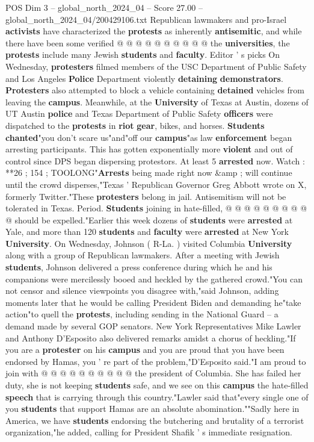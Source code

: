 \begin{textsample}{POS Dim 3 – global\_north\_2024\_04 – Score 27.00 – global\_north\_2024\_04/200429106.txt}
Republican lawmakers and pro-Israel \textbf{activists} have characterized the \textbf{protests} as inherently \textbf{antisemitic}, and while there have been some verified @ @ @ @ @ @ @ @ @ @ the \textbf{universities}, the \textbf{protests} include many Jewish \textbf{students} and \textbf{faculty}.
Editor ' s picks On Wednesday, \textbf{protesters} filmed members of the USC Department of Public Safety and Los Angeles \textbf{Police} Department violently \textbf{detaining} \textbf{demonstrators}. \textbf{Protesters} also attempted to block a vehicle containing \textbf{detained} vehicles from leaving the \textbf{campus}.
Meanwhile, at the \textbf{University} of Texas at Austin, dozens of UT Austin \textbf{police} and Texas Department of Public Safety \textbf{officers} were dispatched to the \textbf{protests} in \textbf{riot} \textbf{gear}, bikes, and horses. \textbf{Students} \textbf{chanted}"you don't scare us"and"off our \textbf{campus}"as law \textbf{enforcement} began arresting participants.
This has gotten exponentially more \textbf{violent} and out of control since DPS began dispersing protestors.
At least 5 \textbf{arrested} now.
Watch : **26 ; 154 ; TOOLONG"\textbf{Arrests} being made right now \&amp ; will continue until the crowd disperses,"Texas ' Republican Governor Greg Abbott wrote on X, formerly Twitter."These \textbf{protesters} belong in jail.
Antisemitism will not be tolerated in Texas.
Period. \textbf{Students} joining in hate-filled, @ @ @ @ @ @ @ @ @ @ should be expelled."Earlier this week dozens of \textbf{students} were \textbf{arrested} at Yale, and more than 120 \textbf{students} and \textbf{faculty} were \textbf{arrested} at New York \textbf{University}.
On Wednesday, Johnson ( R-La. ) visited Columbia \textbf{University} along with a group of Republican lawmakers.
After a meeting with Jewish \textbf{students}, Johnson delivered a press conference during which he and his companions were mercilessly booed and heckled by the gathered crowd."You can not censor and silence viewpoints you disagree with,"said Johnson, adding moments later that he would be calling President Biden and demanding he"take action"to quell the \textbf{protests}, including sending in the National Guard -- a demand made by several GOP senators.
New York Representatives Mike Lawler and Anthony D'Esposito also delivered remarks amidst a chorus of heckling."If you are a \textbf{protester} on his \textbf{campus} and you are proud that you have been endorsed by Hamas, you ' re part of the problem,"D'Esposito said."I am proud to join with @ @ @ @ @ @ @ @ @ @ the president of Columbia.
She has failed her duty, she is not keeping \textbf{students} safe, and we see on this \textbf{campus} the hate-filled \textbf{speech} that is carrying through this country."Lawler said that"every single one of you \textbf{students} that support Hamas are an absolute abomination.""Sadly here in America, we have \textbf{students} endorsing the butchering and brutality of a terrorist organization,"he added, calling for President Shafik ' s immediate resignation.


\end{textsample}
